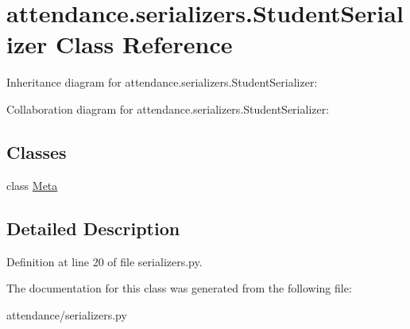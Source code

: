 \hypertarget{classattendance_1_1serializers_1_1_student_serializer}{}\section{attendance.\+serializers.\+Student\+Serializer Class Reference}
\label{classattendance_1_1serializers_1_1_student_serializer}


Inheritance diagram for attendance.\+serializers.\+Student\+Serializer\+:


Collaboration diagram for attendance.\+serializers.\+Student\+Serializer\+:
\subsection*{Classes}
\begin{DoxyCompactItemize}
\item 
class \hyperlink{classattendance_1_1serializers_1_1_student_serializer_1_1_meta}{Meta}
\end{DoxyCompactItemize}


\subsection{Detailed Description}


Definition at line 20 of file serializers.\+py.



The documentation for this class was generated from the following file\+:\begin{DoxyCompactItemize}
\item 
attendance/serializers.\+py\end{DoxyCompactItemize}
